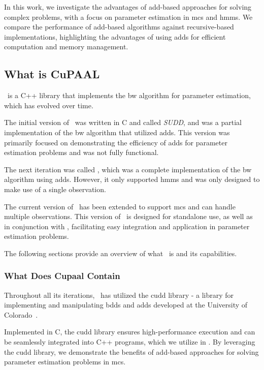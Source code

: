 In this work, we investigate the advantages of \gls{add}-based approaches for solving complex problems, with a focus on parameter estimation in \glspl{mc} and \glspl{hmm}. We compare the performance of \gls{add}-based algorithms against recursive-based implementations, highlighting the advantages of using \glspl{add} for efficient computation and memory management.

\subsection{What is CuPAAL}\label{subsec:what_is_cupaal}
\Cupaal\ is a C++ library that implements the \gls{bw} algorithm for parameter estimation, which has evolved over time.

The initial version of \Cupaal\ was written in C and called \textit{SUDD}, and was a partial implementation of the \gls{bw} algorithm that utilized \glspl{add}. This version was primarily focused on demonstrating the efficiency of \glspl{add} for parameter estimation problems and was not fully functional.

The next iteration was called \Cupaal, which was a complete implementation of the \gls{bw} algorithm using \glspl{add}. However, it only supported \glspl{hmm} and was only designed to make use of a single observation.

The current version of \Cupaal\ has been extended to support \glspl{mc} and can handle multiple observations. This version of \Cupaal\ is designed for standalone use, as well as in conjunction with \Jajapy, facilitating easy integration and application in parameter estimation problems.

The following sections provide an overview of what \Cupaal\ is and its capabilities.

\subsubsection{What Does Cupaal Contain}\label{subsec:what_does_cupaal_contain}
Throughout all its iterations, \Cupaal\ has utilized the \gls{cudd} library - a library for implementing and manipulating \glspl{bdd} and \glspl{add} developed at the University of Colorado~\cite{somenzi1997cudd}.

Implemented in C, the \gls{cudd} library ensures high-performance execution and can be seamlessly integrated into C++ programs, which we utilize in \Cupaal.
By leveraging the \gls{cudd} library, we demonstrate the benefits of \gls{add}-based approaches for solving parameter estimation problems in \glspl{mc}.

